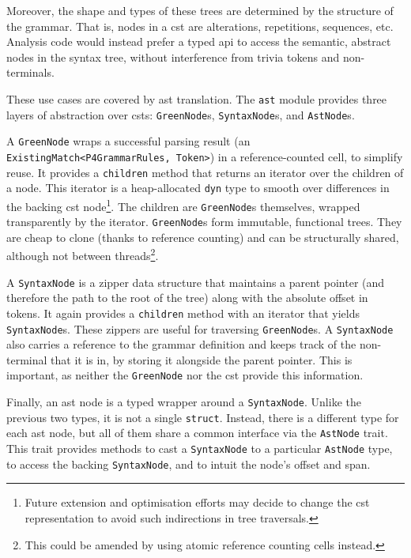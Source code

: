 Moreover, the shape and types of these trees are determined by the structure of
the grammar. That is, nodes in a \acrshort{cst} are alterations, repetitions,
sequences, etc. Analysis code would instead prefer a typed \acrshort{api} to
access the semantic, abstract nodes in the syntax tree, without interference
from trivia tokens and non-terminals.

These use cases are covered by \acrshort{ast} translation. The \texttt{ast}
module provides three layers of abstraction over \acrshort{cst}s:
\texttt{GreenNode}s, \texttt{SyntaxNode}s, and \texttt{AstNode}s.

A \texttt{GreenNode} wraps a successful parsing result (an
\texttt{ExistingMatch<P4GrammarRules, Token>}) in a reference-counted cell, to
simplify reuse. It provides a \texttt{children} method that returns an iterator
over the children of a node. This iterator is a heap-allocated \texttt{dyn} type
to smooth over differences in the backing \acrshort{cst} node\footnote{Future
extension and optimisation efforts may decide to change the \acrshort{cst}
representation to avoid such indirections in tree traversals.}. The children are
\texttt{GreenNode}s themselves, wrapped transparently by the iterator.
\texttt{GreenNode}s form immutable, functional trees. They are cheap to clone
(thanks to reference counting) and can be structurally shared, although not
between threads\footnote{This could be amended by using atomic reference
counting cells instead.}.

A \texttt{SyntaxNode} is a zipper data structure that maintains a parent pointer
(and therefore the path to the root of the tree) along with the absolute offset
in tokens. It again provides a \texttt{children} method with an iterator that
yields \texttt{SyntaxNode}s. These zippers are useful for traversing
\texttt{GreenNode}s. A \texttt{SyntaxNode} also carries a reference to the
grammar definition and keeps track of the non-terminal that it is in, by storing
it alongside the parent pointer. This is important, as neither the
\texttt{GreenNode} nor the \acrshort{cst} provide this information.

Finally, an \acrshort{ast} node is a typed wrapper around a \texttt{SyntaxNode}.
Unlike the previous two types, it is not a single \texttt{struct}. Instead,
there is a different type for each \acrshort{ast} node, but all of them share a
common interface via the \texttt{AstNode} trait. This trait provides methods to
cast a \texttt{SyntaxNode} to a particular \texttt{AstNode} type, to access the
backing \texttt{SyntaxNode}, and to intuit the node's offset and span.

